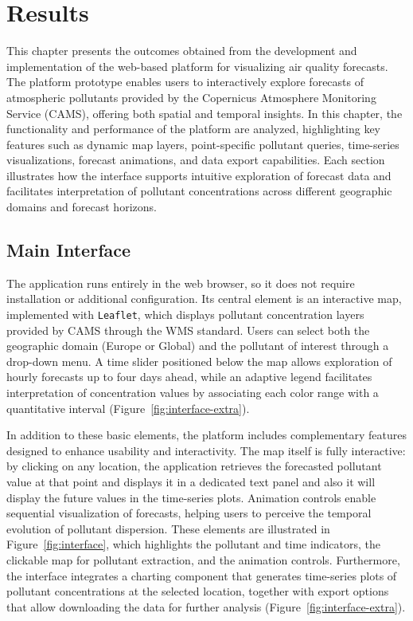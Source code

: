 \chapter[Results]{Results}


This chapter presents the outcomes obtained from the development and implementation of the web-based platform for visualizing air quality forecasts. The platform prototype enables users to interactively explore forecasts of atmospheric pollutants provided by the Copernicus Atmosphere Monitoring Service (CAMS), offering both spatial and temporal insights. In this chapter, the functionality and performance of the platform are analyzed, highlighting key features such as dynamic map layers, point-specific pollutant queries, time-series visualizations, forecast animations, and data export capabilities. Each section illustrates how the interface supports intuitive exploration of forecast data and facilitates interpretation of pollutant concentrations across different geographic domains and forecast horizons.

\section{Main Interface}

The application runs entirely in the web browser, so it does not require installation or additional configuration. 
Its central element is an interactive map, implemented with \texttt{Leaflet}, which displays pollutant concentration layers provided by CAMS through the WMS standard. 
Users can select both the geographic domain (Europe or Global) and the pollutant of interest through a drop-down menu. 
A time slider positioned below the map allows exploration of hourly forecasts up to four days ahead, while an adaptive legend facilitates interpretation of concentration values by associating each color range with a quantitative interval (Figure~\ref{fig:interface-extra}).

In addition to these basic elements, the platform includes complementary features designed to enhance usability and interactivity. 
The map itself is fully interactive: by clicking on any location, the application retrieves the forecasted pollutant value at that point and displays it in a dedicated text panel and also it will display the future values in the time-series plots. 
Animation controls enable sequential visualization of forecasts, helping users to perceive the temporal evolution of pollutant dispersion. 
These elements are illustrated in Figure~\ref{fig:interface}, which highlights the pollutant and time indicators, the clickable map for pollutant extraction, and the animation controls.
Furthermore, the interface integrates a charting component that generates time-series plots of pollutant concentrations at the selected location, together with export options that allow downloading the data for further analysis (Figure~\ref{fig:interface-extra}).

